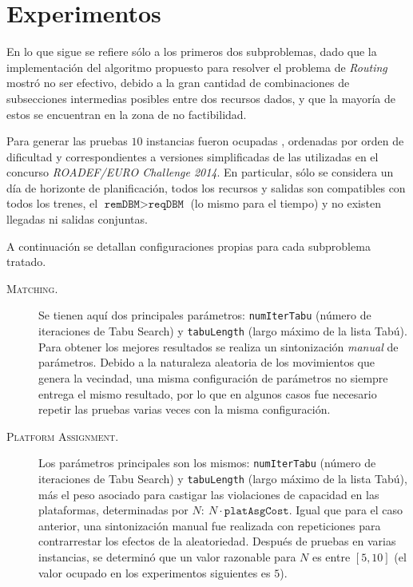 \documentclass[letter, 10pt]{article}
\begin{document}
\section{Experimentos}

En lo que sigue se refiere sólo a los primeros dos subproblemas, dado que la implementación del algoritmo propuesto para resolver el problema de \textit{Routing} mostró no ser efectivo, debido a la gran cantidad de combinaciones de subsecciones intermedias posibles entre dos recursos dados, y que la mayoría de estos se encuentran en la zona de no factibilidad.

Para generar las pruebas $10$ instancias fueron ocupadas \footnotemark[1], ordenadas por orden de dificultad y correspondientes a versiones simplificadas de las utilizadas en el concurso \textit{ROADEF/EURO Challenge 2014}. En particular, sólo se considera un día de horizonte de planificación, todos los recursos y salidas son compatibles con todos los trenes, el $\texttt{remDBM} > \texttt{reqDBM}$ (lo mismo para el tiempo) y no existen llegadas ni salidas conjuntas.

A continuación se detallan configuraciones propias para cada subproblema tratado.

\begin{description}
    \item[\textsc{Matching.}] Se tienen aquí dos principales parámetros: \texttt{numIterTabu} (número de iteraciones de Tabu Search) y \texttt{tabuLength} (largo máximo de la lista Tabú). Para obtener los mejores resultados se realiza un sintonización \textit{manual} de parámetros. Debido a la naturaleza aleatoria de los movimientos que genera la vecindad, una misma configuración de parámetros no siempre entrega el mismo resultado, por lo que en algunos casos fue necesario repetir las pruebas varias veces con la misma configuración.
    \item[\textsc{Platform Assignment.}] Los parámetros principales son los mismos: \texttt{numIterTabu} (número de iteraciones de Tabu Search) y \texttt{tabuLength} (largo máximo de la lista Tabú), más el peso asociado para castigar las violaciones de capacidad en las plataformas, determinadas por $N: \ N \cdot \texttt{platAsgCost}$. Igual que para el caso anterior, una sintonización manual fue realizada con repeticiones para contrarrestar los efectos de la aleatoriedad. Después de pruebas en varias instancias, se determinó que un valor razonable para $N$ es entre $[5,10]$ (el valor ocupado en los experimentos siguientes es $5$).  
\end{description}
\end{document}
